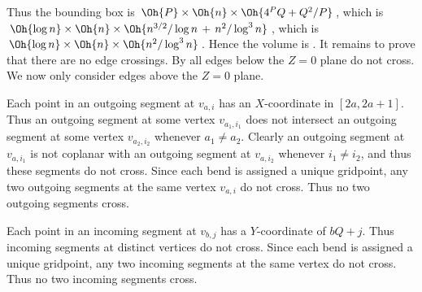 \documentclass[10pt,a4paper]{article}
\begin{document}

Thus the bounding box is $\Oh{P}\times\Oh{n}\times\Oh{4^PQ+Q^2/P}$, which is 
$\Oh{\log n}\times\Oh{n}\times\Oh{n^{3/2}/\log n\,+\,n^2/\log^3n}$, which is
$\Oh{\log n}\times\Oh{n}\times\Oh{n^2/\log^3n}$. Hence the volume is
. It remains to prove that there are no edge crossings. By 
 all edges below the $Z=0$ plane do not cross.
We now only consider edges above the $Z=0$ plane. 

Each point in an outgoing segment at $v_{a,i}$ has an $X$-coordinate in
$[2a,2a+1]$. Thus an outgoing segment at some vertex $v_{a_1,i_1}$ does not
intersect an outgoing segment at some vertex $v_{a_2,i_2}$ whenever $a_1\ne
a_2$. Clearly an outgoing segment at $v_{a,i_1}$ is not coplanar with an
outgoing segment at $v_{a,i_2}$ whenever $i_1\ne i_2$, and thus these segments
do not cross. Since each bend is assigned a unique gridpoint, any two outgoing
segments at the same vertex $v_{a,i}$ do not cross. Thus no two outgoing
segments cross.

Each point in an incoming segment at $v_{b,j}$ has a $Y$-coordinate of $bQ+j$.
Thus incoming segments at distinct vertices do not cross.  Since each bend is
assigned a unique gridpoint, any two incoming segments at the same vertex do not
cross. Thus no two incoming segments cross.
\end{document}
